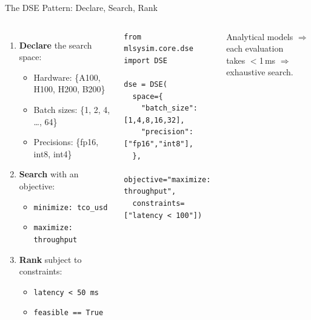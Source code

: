 \documentclass[aspectratio=169, 12pt]{beamer}
\begin{document}
\begin{frame}[fragile]{The DSE Pattern: Declare, Search, Rank}
\begin{columns}[T]
\begin{enumerate}
  \item \textbf{Declare} the search space:
    \begin{itemize}\footnotesize
      \item Hardware: \{A100, H100, H200, B200\}
      \item Batch sizes: \{1, 2, 4, \ldots, 64\}
      \item Precisions: \{fp16, int8, int4\}
    \end{itemize}
  \item \textbf{Search} with an objective:
    \begin{itemize}\footnotesize
      \item \texttt{minimize: tco\_usd}
      \item \texttt{maximize: throughput}
    \end{itemize}
  \item \textbf{Rank} subject to constraints:
    \begin{itemize}\footnotesize
      \item \texttt{latency < 50 ms}
      \item \texttt{feasible == True}
    \end{itemize}
\end{enumerate}

\begin{lstlisting}
from mlsysim.core.dse import DSE

dse = DSE(
  space={
    "batch_size": [1,4,8,16,32],
    "precision": ["fp16","int8"],
  },
  objective="maximize: throughput",
  constraints=["latency < 100"])
\end{lstlisting}
\vspace{0.3em}
\small
Analytical models $\Rightarrow$ each evaluation\\
takes $<$1\,ms $\Rightarrow$ exhaustive search.
\end{columns}
\end{frame}
\end{document}
